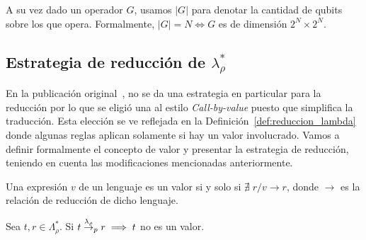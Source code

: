 \begin{definicion}[$|G|$]
A su vez dado un operador $G$, usamos $|G|$ para denotar la cantidad de qubits sobre los que opera. Formalmente, $|G| = N \Longleftrightarrow G$ es de dimensión $2^N \times 2^N$.
\end{definicion}


\subsection{\texorpdfstring{Estrategia de reducción de $\lambda_\rho^*$}{Estrategia de reducción de Lambda Rho*}}
En la publicación original~\cite{lamrho}, no se da una estrategia en particular para la reducción por lo que se eligió una al estilo \textit{Call-by-value} puesto que simplifica la traducción. Esta elección se ve reflejada en la Definición~\ref{def:reduccion_lambda} donde algunas reglas aplican solamente si hay un valor involucrado. Vamos a definir formalmente el concepto de valor y presentar la estrategia de reducción, teniendo en cuenta las modificaciones mencionadas anteriormente.

\begin{definicion}[Valor]
    \label{def:valor}
    Una expresión $v$ de un lenguaje es un valor si y solo si $\nexists\;r / v \rightarrow r$, donde $\rightarrow$ es la relación de reducción de dicho lenguaje. 
\end{definicion}

\begin{observacion}
    Sea $t,r\in\Lambda_\rho^*$. Si $t \overset{\lambda_\rho}{\rightarrow}_p r \implies t $ no es un valor.
\end{observacion}


